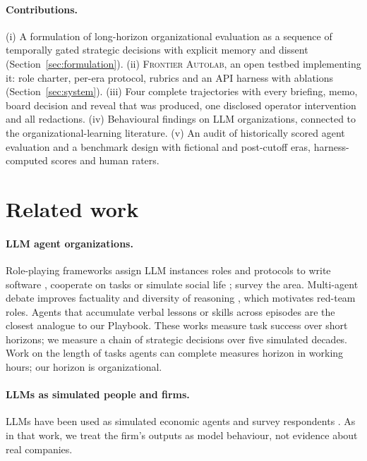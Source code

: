 \documentclass[11pt]{article}
\theoremstyle{definition}
\newcommand{\sys}{\textsc{Frontier Autolab}}
\begin{document}
\paragraph{Contributions.} (i) A formulation of long-horizon organizational evaluation as a sequence of temporally gated strategic decisions with explicit memory and dissent (Section~\ref{sec:formulation}). (ii) \sys{}, an open testbed implementing it: role charter, per-era protocol, rubrics and an API harness with ablations (Section~\ref{sec:system}). (iii) Four complete trajectories with every briefing, memo, board decision and reveal that was produced, one disclosed operator intervention and all redactions. (iv) Behavioural findings on LLM organizations, connected to the organizational-learning literature. (v) An audit of historically scored agent evaluation and a benchmark design with fictional and post-cutoff eras, harness-computed scores and human raters.

\section{Related work}

\paragraph{LLM agent organizations.} Role-playing frameworks assign LLM instances roles and protocols to write software \citep{qian2024chatdev,hong2024metagpt}, cooperate on tasks \citep{li2023camel,chen2024agentverse} or simulate social life \citep{park2023generative}; \citet{guo2024survey} survey the area. Multi-agent debate improves factuality and diversity of reasoning \citep{du2024debate,liang2024divergent}, which motivates red-team roles. Agents that accumulate verbal lessons or skills across episodes \citep{shinn2023reflexion,wang2023voyager} are the closest analogue to our Playbook. These works measure task success over short horizons; we measure a chain of strategic decisions over five simulated decades. Work on the length of tasks agents can complete \citep{kwa2025timehorizon} measures horizon in working hours; our horizon is organizational.

\paragraph{LLMs as simulated people and firms.} LLMs have been used as simulated economic agents \citep{horton2023homo} and survey respondents \citep{argyle2023outofone}. As in that work, we treat the firm's outputs as model behaviour, not evidence about real companies.
\end{document}
